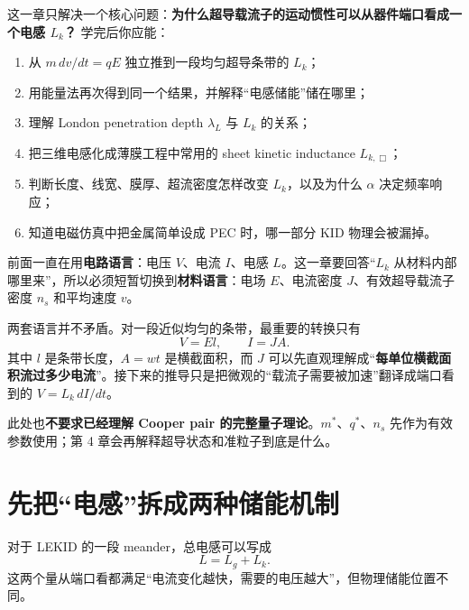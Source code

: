 \documentclass[11pt,a4paper,openany]{ctexrep}
\begin{document}
\begin{goalbox}
这一章只解决一个核心问题：\textbf{为什么超导载流子的运动惯性可以从器件端口看成一个电感 $L_k$？}
学完后你应能：
\begin{enumerate}
  \item 从 $m\,dv/dt=qE$ 独立推到一段均匀超导条带的 $L_k$；
  \item 用能量法再次得到同一个结果，并解释“电感储能”储在哪里；
  \item 理解 London penetration depth $\lambda_L$ 与 $L_k$ 的关系；
  \item 把三维电感化成薄膜工程中常用的 sheet kinetic inductance $L_{k,\Box}$；
  \item 判断长度、线宽、膜厚、超流密度怎样改变 $L_k$，以及为什么 $\alpha$ 决定频率响应；
  \item 知道电磁仿真中把金属简单设成 PEC 时，哪一部分 KID 物理会被漏掉。
\end{enumerate}
\end{goalbox}

\begin{tcolorbox}[colback=KidBlue!4,colframe=KidBlue!60,boxrule=0.7pt,arc=2mm,title=先认清两套语言：这一章为什么突然出现 $E$、$J$、$n_s$ 和 $v$？,fonttitle=\bfseries]
前面一直在用\textbf{电路语言}：电压 $V$、电流 $I$、电感 $L$。这一章要回答“$L_k$ 从材料内部哪里来”，所以必须短暂切换到\textbf{材料语言}：电场 $E$、电流密度 $J$、有效超导载流子密度 $n_s$ 和平均速度 $v$。

两套语言并不矛盾。对一段近似均匀的条带，最重要的转换只有
\[
\boxed{V=El,\qquad I=JA.}
\]
其中 $l$ 是条带长度，$A=wt$ 是横截面积，而 $J$ 可以先直观理解成“\textbf{每单位横截面积流过多少电流}”。接下来的推导只是把微观的“载流子需要被加速”翻译成端口看到的 $V=L_k\,dI/dt$。

此处也\textbf{不要求已经理解 Cooper pair 的完整量子理论}。$m^*$、$q^*$、$n_s$ 先作为有效参数使用；第 4 章会再解释超导状态和准粒子到底是什么。
\end{tcolorbox}

\section{先把“电感”拆成两种储能机制}
对于 LEKID 的一段 meander，总电感可以写成
\[
L=L_g+L_k.
\]
这两个量从端口看都满足“电流变化越快，需要的电压越大”，但物理储能位置不同。

\begin{center}
\end{center}
\end{document}
